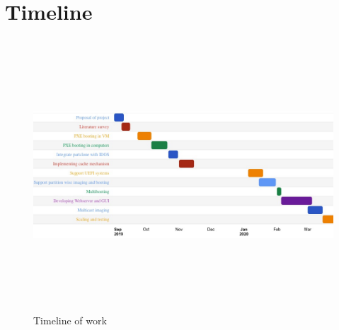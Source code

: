 \documentclass[a4paper,12pt]{article}
\begin{document}
\section{\fontsize{16pt}{1em} Timeline}
 \begin{figure}[h!]
    \centering
    \includegraphics[height=4in, width=7in, angle=-90]{timeline.jpeg}
    \caption{Timeline of work}
    \label{timeline}
\end{figure}
\end{document}
